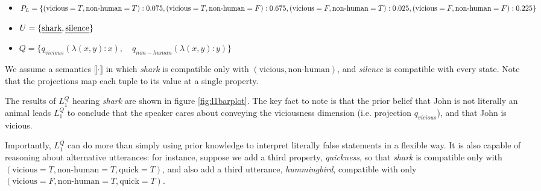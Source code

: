 \documentclass[OpenMind]{stjour}
\newcommand{\Listener}{L}
\newcommand{\QLONE}{\Listener_{{1}}^{{Q}}}
\begin{document}
	\begin{itemize}
	\item $P_L = \{(\textrm{vicious}=T,\textrm{non-human}=T) : 0.075, \\(\textrm{vicious}=T,\textrm{non-human}=F) : 0.675,\\ (\textrm{vicious}=F,\textrm{non-human}=T) : 0.025, \\(\textrm{vicious}=F,\textrm{non-human}=F): 0.225\}$
	\item $U = \{\textrm{\emph{shark}}, \textrm{\emph{silence}}\}$
	\item $Q = \{q_{vicious} (\lambda (x,y):x),\quad q_{non-human} (\lambda (x,y):y) \}$ 
	\end{itemize}

	We assume a semantics $\llbracket\cdot\rrbracket$ in which \emph{shark} is compatible only with $(\textrm{vicious}, \textrm{non-human})$, and \emph{silence} is compatible with every state. Note that the projections map each tuple to its value at a single property. 
	
	The results of $\QLONE$ hearing \emph{shark} are shown in figure \ref{fig:l1barplot}.
	The key fact to note is that the prior belief that John is not literally an animal leads $\QLONE$ to conclude that the speaker cares about conveying the viciousness dimension (i.e. projection $q_{vicious}$), and that John is vicious.

	Importantly, $\QLONE$ can do more than simply using prior knowledge to interpret literally false statements in a flexible way. It is also capable of reasoning about alternative utterances: for instance, suppose we add a third property, \emph{quickness}, so that \emph{shark} is compatible only with $(\textrm{vicious}=T, \textrm{non-human}=T, \textrm{quick}=T)$, and also add a third utterance, \emph{hummingbird}, compatible with only $(\textrm{vicious}=F, \textrm{non-human}=T, \textrm{quick}=T)$.
	
\end{document}
